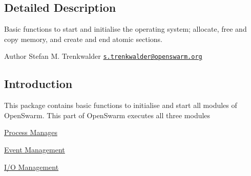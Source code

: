 \subsection{Detailed Description}
Basic functions to start and initialise the operating system; allocate, free and copy memory, and create and end atomic sections. 

\begin{DoxyAuthor}{Author}
Stefan M. Trenkwalder \href{mailto:s.trenkwalder@openswarm.org}{\tt s.\+trenkwalder@openswarm.\+org}
\end{DoxyAuthor}
\hypertarget{group__base_sec_intro_base}{}\subsection{Introduction}\label{group__base_sec_intro_base}
This package contains basic functions to initialise and start all modules of Open\+Swarm. This part of Open\+Swarm executes all three modules
\begin{DoxyEnumerate}
\item \hyperlink{group__process}{Process Manages}
\item \hyperlink{group__events}{Event Management}
\item \hyperlink{group__io}{I/\+O Management}
\end{DoxyEnumerate}

